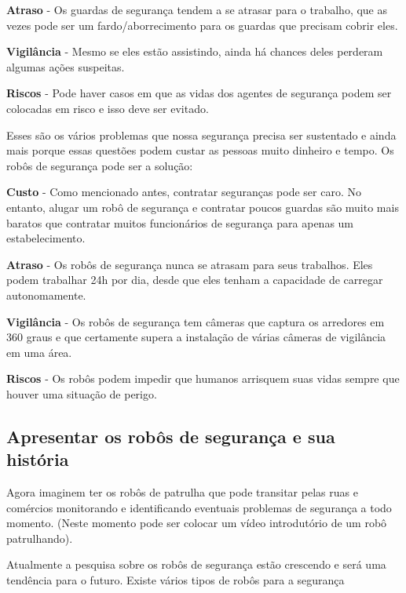 \documentclass[12pt,a4paper]{article}
\begin{document}
    \textbf{Atraso} - Os guardas de segurança tendem a se atrasar para o trabalho, que as vezes pode ser um fardo/aborrecimento para os guardas que precisam cobrir eles.

    \textbf{Vigilância} - Mesmo se eles estão assistindo, ainda há chances deles perderam algumas ações suspeitas.

    \textbf{Riscos} - Pode haver casos em que as vidas dos agentes de segurança podem ser colocadas em risco e isso deve ser evitado.

    Esses são os vários problemas que nossa segurança precisa ser sustentado e ainda mais porque essas questões podem custar as pessoas muito dinheiro e tempo. Os robôs de segurança pode ser a solução:

    \textbf{Custo} - Como mencionado antes, contratar seguranças pode ser caro. No entanto, alugar um robô de segurança e contratar poucos guardas são muito mais baratos que contratar muitos funcionários de segurança para apenas um estabelecimento.

    \textbf{Atraso} - Os robôs de segurança nunca se atrasam para seus trabalhos. Eles podem trabalhar 24h por dia, desde que eles tenham a capacidade de carregar autonomamente.

    \textbf{Vigilância} - Os robôs de segurança tem câmeras que captura os arredores em 360 graus e que certamente supera a instalação de várias câmeras de vigilância em uma área.

    \textbf{Riscos} - Os robôs podem impedir que humanos arrisquem suas vidas sempre que houver uma situação de perigo.

    \subsection{Apresentar os robôs de segurança e sua história}
    Agora imaginem ter os robôs de patrulha que pode transitar pelas ruas e comércios monitorando e identificando eventuais problemas de segurança a todo momento.  (Neste momento pode ser colocar um vídeo introdutório de um robô patrulhando).

    Atualmente a pesquisa sobre os robôs de segurança estão crescendo e será uma tendência para o futuro. Existe vários tipos de robôs para a segurança

\end{document}

